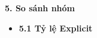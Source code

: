 \textbf{5. So sánh nhóm }
\begin{itemize}
    \item \textbf{5.1 Tỷ lệ Explicit}
       





        



\end{itemize}
